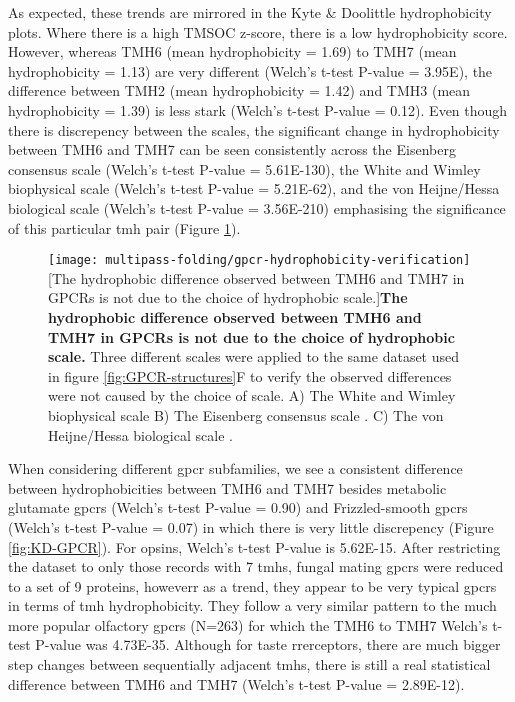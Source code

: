 As expected, these trends are mirrored in the Kyte \& Doolittle \cite{Kyte1982} hydrophobicity plots.
Where there is a high TMSOC z\--score, there is a low hydrophobicity score.
However, whereas TMH6 (mean hydrophobicity = 1.69) to TMH7 (mean hydrophobicity = 1.13) are very different (Welch's t\--test P\--value = 3.95E), the difference between TMH2 (mean hydrophobicity = 1.42) and TMH3 (mean hydrophobicity = 1.39) is less stark (Welch's t\--test P\--value = 0.12).
Even though there is discrepency between the scales, the significant change in hydrophobicity  between TMH6 and TMH7 can be seen consistently across the Eisenberg consensus scale \cite{Eisenberg1984} (Welch's t\--test P\--value = 5.61E-130), the White and Wimley biophysical scale \cite{White1999} (Welch's t\--test P\--value = 5.21E-62), and the von Heijne/Hessa biological scale \cite{Hessa2005} (Welch's t\--test P\--value = 3.56E-210) emphasising the significance of this particular \gls{tmh} pair (Figure \ref{fig:gpcr-hydrophobicity-verification}).

\begin{figure}[!ht]
\centering
\texttt{[image: multipass-folding/gpcr-hydrophobicity-verification]}
		[The hydrophobic difference observed between TMH6 and TMH7 in GPCRs is not due to the choice of hydrophobic scale.]{\textbf{The hydrophobic difference observed between TMH6 and TMH7 in GPCRs is not due to the choice of hydrophobic scale.}
    Three different scales were applied to the same dataset used in figure \ref{fig:GPCR-structures}F to verify the observed differences were not caused by the choice of scale.
    A) The White and Wimley biophysical scale \cite{White1999}
    B) The Eisenberg consensus scale \cite{Eisenberg1984}.
    C) The von Heijne/Hessa biological scale \cite{Hessa2005}.}

\label{fig:gpcr-hydrophobicity-verification}
\end{figure}

When considering different \gls{gpcr} subfamilies, we see a consistent difference between hydrophobicities between TMH6 and TMH7 besides metabolic glutamate \gls{gpcr}s (Welch's t\--test P\--value = 0.90) and Frizzled-smooth \gls{gpcr}s (Welch's t\--test P\--value = 0.07) in which there is very little discrepency (Figure \ref{fig:KD-GPCR}).
For opsins, Welch's t\--test P\--value is 5.62E-15.
After restricting the dataset to only those records with 7 \gls{tmh}s, fungal mating \gls{gpcr}s were reduced to a set of 9 proteins, howeverr as a trend, they appear to be very typical \gls{gpcr}s in terms of \gls{tmh} hydrophobicity.
They follow a very similar pattern to the much more popular olfactory \gls{gpcr}s (N=263) for which the TMH6 to TMH7 Welch's t\--test P\--value was 4.73E-35.
Although for taste rrerceptors, there are much bigger step changes between sequentially adjacent \gls{tmh}s, there is still a real statistical difference between TMH6 and TMH7 (Welch's t\--test P\--value = 2.89E-12).

